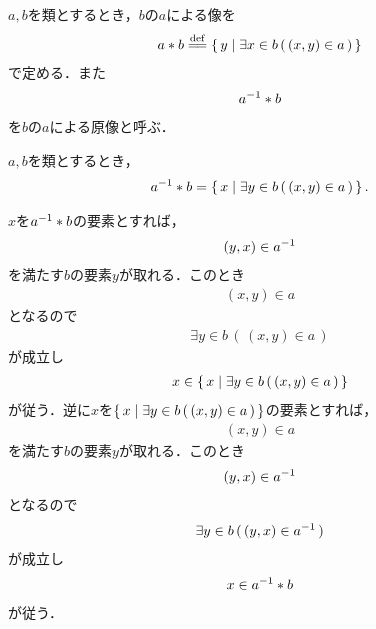 	\begin{screen}
		\begin{dfn}[像・原像]
			$a,b$を類とするとき，$b$の$a$による像を
			\begin{align}
				a \ast b \defeq \Set{y}{\exists x \in b\, (\, (x,y) \in a\, )} 
			\end{align}
			で定める．また
			\begin{align}
				{a}^{-1} \ast b
			\end{align}
			を$b$の$a$による原像と呼ぶ．
		\end{dfn}
	\end{screen}
	
	\begin{screen}
		\begin{thm}[原像はそこに写される定義域の要素の全体]
			$a,b$を類とするとき，
			\begin{align}
				{a}^{-1} \ast b = \left\{\, x \mid \exists y \in b\, (\, (x,y) \in a\, )\, \right\}.
			\end{align}
		\end{thm}
	\end{screen}
	
	\begin{sketch}
		$x$を${a}^{-1} \ast b$の要素とすれば，
		\begin{align}
			(y,x) \in {a}^{-1}
		\end{align}
		を満たす$b$の要素$y$が取れる．このとき
		\begin{align}
			(x,y) \in a
		\end{align}
		となるので
		\begin{align}
			\exists y \in b\, (\, (x,y) \in a\, )
		\end{align}
		が成立し
		\begin{align}
			x \in \left\{\, x \mid \exists y \in b\, (\, (x,y) \in a\, )\, \right\}
		\end{align}
		が従う．逆に$x$を$\left\{\, x \mid \exists y \in b\, (\, (x,y) \in a\, )\, \right\}$の要素とすれば，
		\begin{align}
			(x,y) \in a
		\end{align}
		を満たす$b$の要素$y$が取れる．このとき
		\begin{align}
			(y,x) \in {a}^{-1}
		\end{align}
		となるので
		\begin{align}
			\exists y \in b\, (\, (y,x) \in {a}^{-1}\, )
		\end{align}
		が成立し
		\begin{align}
			x \in {a}^{-1} \ast b
		\end{align}
		が従う．
		\QED
	\end{sketch}
	
